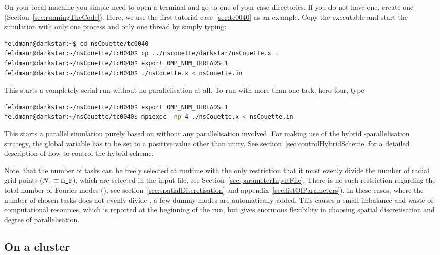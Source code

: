 \documentclass[a4paper, 11pt, DIV=11]{scrartcl}
\begin{document}
On your local machine you simple need to open a terminal and go to one of your case
directories. If you do not have one, create one (Section~\ref{sec:runningTheCode}).
Here, we use the first tutorial case~\ref{sec:tc0040} as an example. Copy the executable
and start the simulation with only one \mpi process and only one \omp thread by simply
typing:
\begin{lstlisting}[language=bash]
feldmann@darkstar:~$ cd nsCouette/tc0040
feldmann@darkstar:~/nsCouette/tc0040$ cp ../nscouette/darkstar/nsCouette.x .
feldmann@darkstar:~/nsCouette/tc0040$ export OMP_NUM_THREADS=1
feldmann@darkstar:~/nsCouette/tc0040$ ./nsCouette.x < nsCouette.in
\end{lstlisting}
This starts a completely serial run without no parallelisation at all. To run \nsc with
more than one \mpi task, here \eg four, type
\begin{lstlisting}[language=bash]
feldmann@darkstar:~/nsCouette/tc0040$ export OMP_NUM_THREADS=1
feldmann@darkstar:~/nsCouette/tc0040$ mpiexec -np 4 ./nsCouette.x < nsCouette.in
\end{lstlisting}
This starts a parallel simulation purely based on \mpi without any \omp parallelisation
involved. For making use of the hybrid \mpi-\omp parallelisation strategy, the global
variable  has to be set to a positive value other than unity. See
section~\ref{sec:controlHybridScheme} for a detailed description of how to control the
hybrid scheme.
\par
Note, that the number of \mpi tasks can be freely selected at runtime with the only
restriction that it must evenly divide the number of radial grid points
($N_{r}\equiv\textbf{\texttt{\color{black}m\_r}}$), which are selected in the  input file, see
Section~\ref{sec:parameterInputFile}. There is no such restriction regarding the total
number of Fourier modes (), see section~\ref{sec:spatialDiscretisation}
and appendix~\ref{sec:listOfParameters}). In these cases, where the number of chosen \mpi
tasks does not evenly divide , a few dummy modes are automatically added. This
causes a small imbalance and waste of computational resources, which is reported at the
beginning of the run, but gives enormous flexibility in choosing spatial discretisation
and degree of parallelisation.

\subsection{On a cluster}
\label{sec:onCluster}
\end{document}
